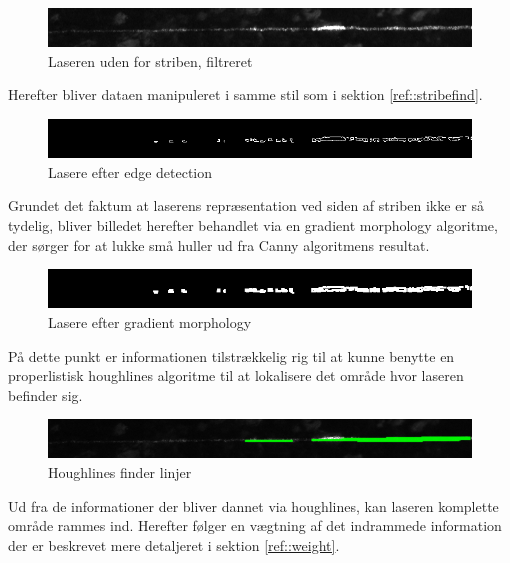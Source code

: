\begin{figure}[h]
	\centering
	\includegraphics[width=0.7\linewidth]{Billeder/base_1_filter}
	\caption{Laseren uden for striben, filtreret}
	\label{fig:base_1_filter}
\end{figure}

Herefter bliver dataen manipuleret i samme stil som i sektion \ref{ref::stribefind}.

\begin{figure}[h]
	\centering
	\includegraphics[width=0.7\linewidth]{Billeder/base_2_canny}
	\caption{Lasere efter edge detection}
	\label{fig:base_2_canny}
\end{figure}

Grundet det faktum at laserens repræsentation ved siden af striben ikke er så tydelig, bliver billedet herefter behandlet via en gradient morphology algoritme, der sørger for at lukke små huller ud fra Canny algoritmens resultat.

\begin{figure}[h]
	\centering
	\includegraphics[width=0.7\linewidth]{Billeder/base_3_morph}
	\caption{Lasere efter gradient morphology}
	\label{fig:base_3_morph}
\end{figure}

På dette punkt er informationen tilstrækkelig rig til at kunne benytte en properlistisk houghlines algoritme til at lokalisere det område hvor laseren befinder sig.

\begin{figure}[h]
	\centering
	\includegraphics[width=0.7\linewidth]{Billeder/base_4_houghP}
	\caption{Houghlines finder linjer}
	\label{fig:base_4_hough}
\end{figure}

\newpage

Ud fra de informationer der bliver dannet via houghlines, kan laseren komplette område rammes ind. Herefter følger en vægtning af det indrammede information der er beskrevet mere detaljeret i sektion \ref{ref::weight}.

